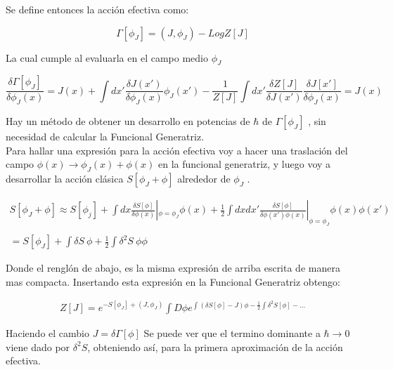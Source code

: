 Se define entonces la acción efectiva como:

\begin{equation}
\Gamma [\phi _J] = (J, \phi _J) - Log Z [J]
\end{equation}

La cual cumple al evaluarla en el campo medio $\phi _J $


\begin{equation}
\frac{\delta \Gamma [ \phi _J ]}{\delta \phi _J (x) } = 
J(x) + \int dx ' \frac{\delta J (x')}{\delta \phi _J (x) } \phi _J (x') - 
\frac{1}{Z[J]} \int dx' \frac{\delta Z[J] }{\delta J(x')} \frac{\delta J[x']}{\delta \phi _J (x)} = J(x)
\end{equation}

Hay un método de obtener un desarrollo en potencias de $\hbar$ de $\Gamma [ \phi _J]$ , sin necesidad de calcular la Funcional Generatriz. \\


Para hallar una expresión para la acción efectiva voy a hacer una traslación del campo $\phi (x) \rightarrow \phi _{J} (x) + \phi (x) $ en la funcional generatriz, y luego voy a desarrollar la acción clásica  $ S[ \phi _J + \phi ] $ alrededor de $ \phi _J $ .

\begin{equation}
\begin{array}{c}
S [\phi _J + \phi ] \approx
S[ \phi _j ] +
\int dx \frac{\delta S[\phi]}{\delta \phi (x) } | _ {\phi = \phi _J} \phi( x ) +
\frac{1}{2}
\int dx dx' \frac{\delta S[\phi]}{\delta \phi (x') \phi (x) } | _ {\phi = \phi _J} \phi( x ) \phi (x')  \\ \\
= S[ \phi _J ] + \int \delta S \ \phi + \frac{1}{2} \int \delta ^2 S \ \phi \phi
\end{array}
\end{equation}

Donde el renglón de abajo, es la misma expresión de arriba escrita de manera mas compacta. Insertando  esta expresión en la Funcional Generatriz obtengo:

\begin{equation}
\begin{array}{c}
Z[J] = e ^{-S[ \phi _J ] + (J, \phi _J )} 
\int D \phi e ^{ \int (\delta S [\phi] - J) \phi - \frac{1}{2} \int \delta ^2 S[\phi ] - ... }
\end{array}
\end{equation}

Haciendo el cambio $J = \delta \Gamma [ \phi ]$ Se puede ver que el termino dominante a $\hbar \rightarrow 0$ viene dado por $\delta ^2 S$, obteniendo así, para la primera aproximación de la acción efectiva.





